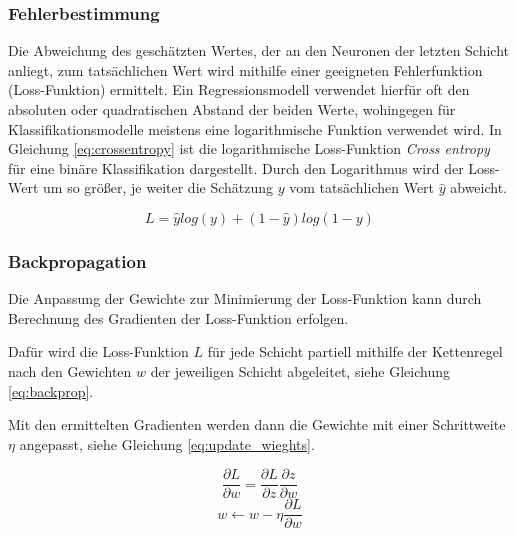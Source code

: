 \subsubsection{Fehlerbestimmung}
Die Abweichung des geschätzten Wertes, der an den
Neuronen der letzten Schicht anliegt, zum tatsächlichen Wert
wird mithilfe einer geeigneten Fehlerfunktion (Loss-Funktion)
ermittelt.
Ein Regressionsmodell verwendet hierfür oft 
den absoluten oder quadratischen Abstand der beiden 
Werte, wohingegen für Klassifikationsmodelle meistens 
eine logarithmische Funktion verwendet wird.
In Gleichung \ref{eq:crossentropy} ist die logarithmische
Loss-Funktion \textit{Cross entropy} für eine binäre
Klassifikation dargestellt.
Durch den Logarithmus wird der Loss-Wert um so größer,
je weiter die Schätzung $y$ vom 
tatsächlichen Wert $\hat{y}$ abweicht.
\vspace{0.5cm}

\begin{equation}
    \label{eq:crossentropy}
    L = \hat{y}log(y) + (1 - \hat{y})log(1 - y)
\end{equation}
\vspace{0.5cm}


\subsubsection{Backpropagation}

Die Anpassung der Gewichte zur Minimierung der Loss-Funktion 
kann durch Berechnung des Gradienten der Loss-Funktion erfolgen.

Dafür wird die Loss-Funktion $L$ für jede Schicht partiell
mithilfe der Kettenregel nach den Gewichten $w$ der jeweiligen
Schicht abgeleitet, siehe Gleichung \ref{eq:backprop}.

Mit den ermittelten Gradienten werden
dann die Gewichte 
mit einer Schrittweite $\eta$ angepasst, siehe 
Gleichung \ref{eq:update_wieghts}.
\vspace{0.5cm}

\begin{equation}
    \label{eq:backprop}
    \frac{\partial L}{\partial w} = \frac{\partial L}{\partial z}\frac{\partial z}{\partial w}
\end{equation}
\vspace{0.5cm}
\begin{equation}
    \label{eq:update_wieghts}
    w  \leftarrow w - \eta \frac{\partial L}{\partial w}
\end{equation}
\vspace{1cm}



